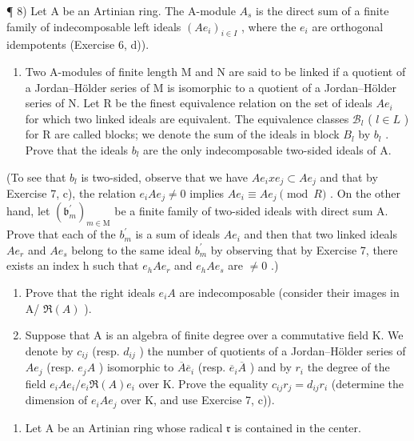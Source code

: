 ¶ 8) Let A be an Artinian ring. The A-module \(A_{s}\) is the direct sum of a finite family of indecomposable left ideals \((Ae_{i})_{i\in I}\) , where the \(e_{i}\) are orthogonal idempotents (Exercise 6, d)).

\begin{enumerate}
\def\labelenumi{\alph{enumi})}
\tightlist
\item
  Two A-modules of finite length M and N are said to be linked if a quotient of a Jordan--Hölder series of M is isomorphic to a quotient of a Jordan--Hölder series of N. Let R be the finest equivalence relation on the set of ideals \(Ae_{i}\) for which two linked ideals are equivalent. The equivalence classes \(\mathcal{B}_{l}\) ( \(l \in L\) ) for R are called blocks; we denote the sum of the ideals in block \(B_{l}\) by \(b_{l}\) . Prove that the ideals \(b_{l}\) are the only indecomposable two-sided ideals of A.
\end{enumerate}

(To see that \(b_{l}\) is two-sided, observe that we have \(Ae_{i}xe_{j} \subset Ae_{j}\) and that by Exercise 7, c), the relation \(e_{i}Ae_{j} \neq 0\) implies \(Ae_{i} \equiv Ae_{j} \pmod{R}\) . On the other hand, let \((\mathfrak{b}_{m}^{\prime})_{m \in \mathrm{M}}\) be a finite family of two-sided ideals with direct sum A. Prove that each of the \(b_{m}^{\prime}\) is a sum of ideals \(Ae_{i}\) and then that two linked ideals \(Ae_{r}\) and \(Ae_{s}\) belong to the same ideal \(b_{m}^{\prime}\) by observing that by Exercise 7, there exists an index h such that \(e_{h}Ae_{r}\) and \(e_{h}Ae_{s}\) are \(\neq 0\) .)

\begin{enumerate}
\def\labelenumi{\alph{enumi})}
\setcounter{enumi}{1}
\item
  Prove that the right ideals \(e_{i}A\) are indecomposable (consider their images in A/ \(\Re(A)\) ).
\item
  Suppose that A is an algebra of finite degree over a commutative field K. We denote by \(c_{ij}\) (resp. \(d_{ij}\) ) the number of quotients of a Jordan--Hölder series of \(Ae_{j}\) (resp. \(e_{j}A\) ) isomorphic to \(\overline{A}\overline{e}_{i}\) (resp. \(\overline{e}_{i}\overline{A}\) ) and by \(r_{i}\) the degree of the field \(e_{i}Ae_{i}/e_{i}\Re(A)e_{i}\) over K. Prove the equality \(c_{ij}r_{j}=d_{ij}r_{i}\) (determine the dimension of \(e_{i}Ae_{j}\) over K, and use Exercise 7, c)).
\end{enumerate}

\begin{enumerate}
\def\labelenumi{\arabic{enumi})}
\setcounter{enumi}{8}
\tightlist
\item
  Let A be an Artinian ring whose radical \(\mathfrak{r}\) is contained in the center.
\end{enumerate}

